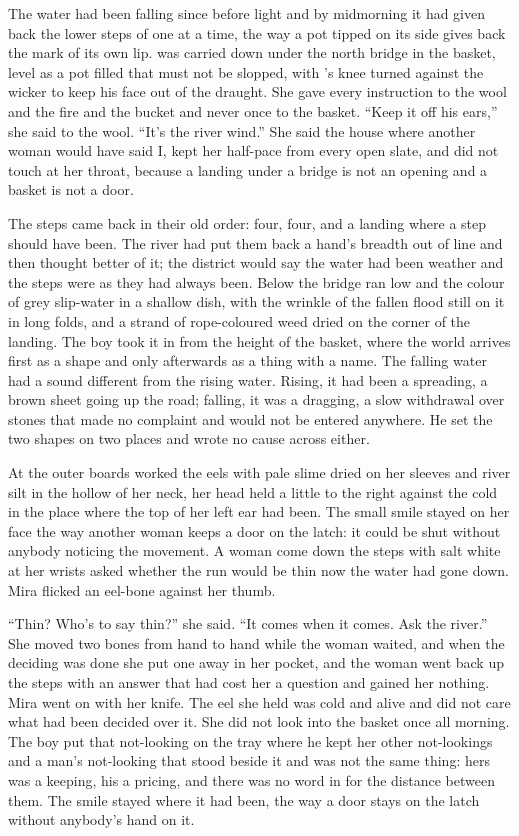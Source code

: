 
The water had been falling since before light and by midmorning it had given back the lower steps of  one at a time, the way a pot tipped on its side gives back the mark of its own lip.  was carried down under the north bridge in the basket, level as a pot filled that must not be slopped, with 's knee turned against the wicker to keep his face out of the draught. She gave every instruction to the wool and the fire and the bucket and never once to the basket. “Keep it off his ears,” she said to the wool. “It's the river wind.” She said the house where another woman would have said I, kept her half-pace from every open slate, and did not touch  at her throat, because a landing under a bridge is not an opening and a basket is not a door.

The steps came back in their old order: four, four, and a landing where a step should have been. The river had put them back a hand's breadth out of line and then thought better of it; the district would say the water had been weather and the steps were as they had always been. Below the bridge  ran low and the colour of grey slip-water in a shallow dish, with the wrinkle of the fallen flood still on it in long folds, and a strand of rope-coloured weed dried on the corner of the landing. The boy took it in from the height of the basket, where the world arrives first as a shape and only afterwards as a thing with a name. The falling water had a sound different from the rising water. Rising, it had been a spreading, a brown sheet going up the road; falling, it was a dragging, a slow withdrawal over stones that made no complaint and would not be entered anywhere. He set the two shapes on two places and wrote no cause across either.

At the outer boards  worked the eels with pale slime dried on her sleeves and river silt in the hollow of her neck, her head held a little to the right against the cold in the place where the top of her left ear had been. The small smile stayed on her face the way another woman keeps a door on the latch: it could be shut without anybody noticing the movement. A woman come down the steps with salt white at her wrists asked whether the run would be thin now the water had gone down. Mira flicked an eel-bone against her thumb.

“Thin? Who's to say thin?” she said. “It comes when it comes. Ask the river.” She moved two bones from hand to hand while the woman waited, and when the deciding was done she put one away in her pocket, and the woman went back up the steps with an answer that had cost her a question and gained her nothing. Mira went on with her knife. The eel she held was cold and alive and did not care what had been decided over it. She did not look into the basket once all morning. The boy put that not-looking on the tray where he kept her other not-lookings and a man's not-looking that stood beside it and was not the same thing: hers was a keeping, his a pricing, and there was no word in  for the distance between them. The smile stayed where it had been, the way a door stays on the latch without anybody's hand on it.

